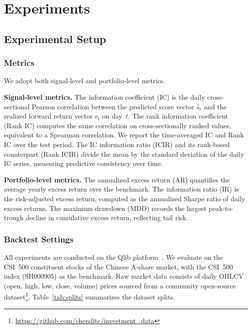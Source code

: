 
\section{Experiments}

\subsection{Experimental Setup}

\subsubsection{Metrics}

We adopt both signal-level and portfolio-level metrics.

\textbf{Signal-level metrics.}
The information coefficient (IC) is the daily cross-sectional Pearson correlation between the predicted score vector $\hat{s}_t$ and the realized forward return vector $r_t$ on day~$t$.
The rank information coefficient (Rank IC) computes the same correlation on cross-sectionally ranked values, equivalent to a Spearman correlation.
We report the time-averaged IC and Rank IC over the test period.
The IC information ratio (ICIR) and its rank-based counterpart (Rank ICIR) divide the mean by the standard deviation of the daily IC series, measuring predictive consistency over time.

\textbf{Portfolio-level metrics.}
The annualized excess return (AR) quantifies the average yearly excess return over the benchmark.
The information ratio (IR) is the risk-adjusted excess return, computed as the annualized Sharpe ratio of daily excess returns.
The maximum drawdown (MDD) records the largest peak-to-trough decline in cumulative excess return, reflecting tail risk.

\subsubsection{Backtest Settings}

All experiments are conducted on the Qlib platform~\cite{yang2020qlib}.
We evaluate on the CSI~500 constituent stocks of the Chinese A-share market, with the CSI~500 index (SH000905) as the benchmark.
Raw market data consists of daily OHLCV (open, high, low, close, volume) prices sourced from a community open-source dataset\footnote{\url{https://github.com/chenditc/investment_data}}.
Table~\ref{tab:splits} summarizes the dataset splits.

